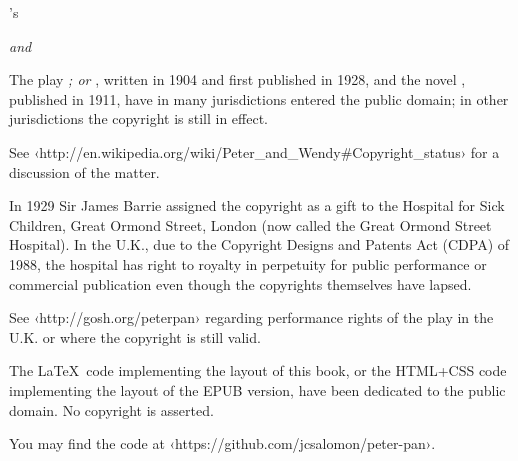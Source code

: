 
\pagestyle{empty}


\vspace*{\fill}
\begin{center}
\HUGE \thetitle
\end{center}
\vspace*{\fill}
\cleardoublepage


\vspace*{\fill}
\begin{center}
\Large\theauthor’s\par
\HUGE\thetitle
\end{center}
\begin{center}\huge\thebooktitle\end{center}
\begin{center}\huge\emph{\Large and}\end{center}
\begin{center}\huge\theplaytitle\end{center}
\vspace*{\fill}
\clearpage


\begingroup
\footnotesize
\setlength{\parindent}{0pt}
\setlength{\parskip}{\baselineskip}

\ccPublicDomain\quad
The play \emph{\thetitle; or \theplaytitle}, written in 1904 and first published in 1928,
and the novel \emph{\thebooktitle}, published in 1911,
have in many jurisdictions entered the public domain;
in other jurisdictions the copyright is still in effect.

See ‹http://en.wikipedia.org/wiki/Peter\_and\_Wendy\#Copyright\_status›
for a discussion of the matter.

In 1929 Sir James Barrie assigned the copyright as a gift
to the Hospital for Sick Children, Great Ormond Street, London
(now called the Great Ormond Street Hospital).
In the U.K.,
due to the Copyright Designs and Patents Act (CDPA) of 1988,
the hospital has right to royalty in perpetuity
for public performance or commercial publication
even though the copyrights themselves have lapsed.

See ‹http://gosh.org/peterpan› regarding performance rights
of the play
in the U.K. or where the copyright is still valid.

\ccZero\quad
The \LaTeX\ code implementing the layout of this book,
or the HTML+CSS code implementing the layout of the EPUB version,
have been dedicated to the public domain.
No copyright is asserted.

You may find the code at ‹https://github.com/jcsalomon/peter-pan›.

\endgroup
\cleardoublepage

\tableofcontents*

\endinput
